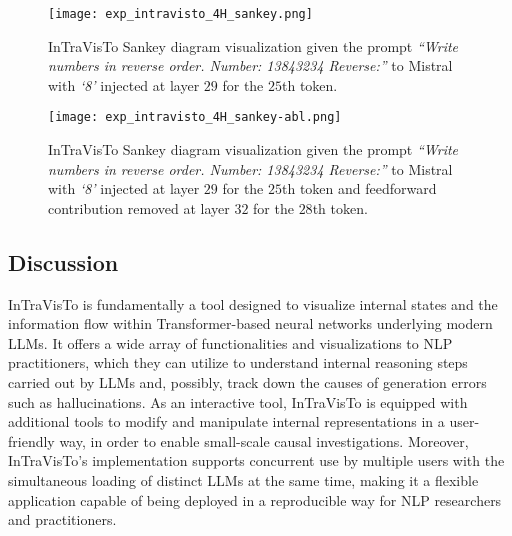 \begin{figure}[t!]
    \centering
    \texttt{[image: exp\_intravisto\_4H\_sankey.png]}
    \caption[InTraVisTo Sankey diagram visualization given the prompt \emph{``Write numbers in reverse order. Number: 13843234 Reverse:''} to Mistral with injection.]{InTraVisTo Sankey diagram visualization given the prompt \emph{``Write numbers in reverse order. Number: 13843234 Reverse:''} to Mistral with \emph{`8'} injected at layer $29$ for the $25$th token.}
    \label{fig:exp_intravisto_4_H1}
\end{figure}
\begin{figure}[t!]
    \centering
    \texttt{[image: exp\_intravisto\_4H\_sankey-abl.png]}
    \caption[InTraVisTo Sankey diagram visualization given the prompt \emph{``Write numbers in reverse order. Number: 13843234 Reverse:''} to Mistral with injection and ablation.]{InTraVisTo Sankey diagram visualization given the prompt \emph{``Write numbers in reverse order. Number: 13843234 Reverse:''} to Mistral with \emph{`8'} injected at layer $29$ for the $25$th token and feedforward contribution removed at layer $32$ for the $28$th token.}
    \label{fig:exp_intravisto_4_H2}
\end{figure}

\subsection{Discussion}

InTraVisTo is fundamentally a tool designed to visualize internal states and the information flow within Transformer-based neural networks underlying modern LLMs.
It offers a wide array of functionalities and visualizations to NLP practitioners, which they can utilize to understand internal reasoning steps carried out by LLMs and, possibly, track down the causes of generation errors such as hallucinations.
As an interactive tool, InTraVisTo is equipped with additional tools to modify and manipulate internal representations in a user-friendly way, in order to enable small-scale causal investigations.
Moreover, InTraVisTo's implementation supports concurrent use by multiple users with the simultaneous loading of distinct LLMs at the same time, making it a flexible application capable of being deployed in a reproducible way for NLP researchers and practitioners.

